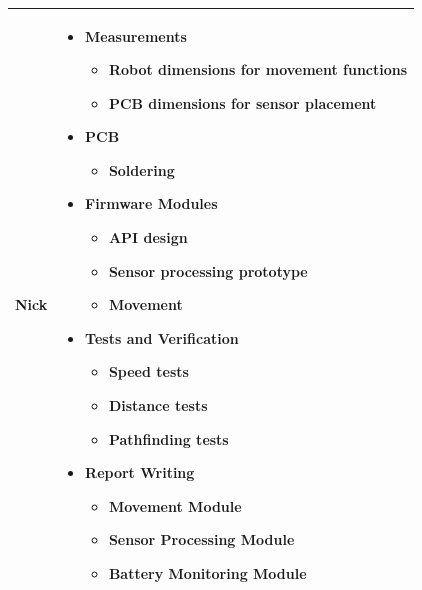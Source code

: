 \documentclass[conference]{IEEEtran}
\begin{document}
\bgroup
\def\arraystretch{1.5}
\begin{tabularx}{\linewidth}{ | c | X | }
	\hline
	Nick & \begin{itemize}
		       \item Measurements
		             \begin{itemize}
			      \item Robot dimensions for movement functions
			      \item PCB dimensions for sensor placement
		      \end{itemize}
		       \item PCB
		             \begin{itemize}
			      \item Soldering
		      \end{itemize}
		       \item Firmware Modules
		             \begin{itemize}
			      \item API design
			      \item Sensor processing prototype
			      \item Movement
		      \end{itemize}
		       \item Tests and Verification
		             \begin{itemize}
			      \item Speed tests
			      \item Distance tests
			      \item Pathfinding tests
		      \end{itemize}
		       \item Report Writing
		             \begin{itemize}
			      \item Movement Module
			      \item Sensor Processing Module
			      \item Battery Monitoring Module
		      \end{itemize}
	       \end{itemize} \\
	\hline
\end{tabularx}
\end{document}
